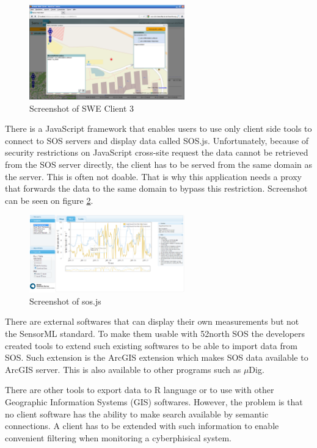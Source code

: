 \begin{figure}[h]
\centering
\includegraphics[width=0.6\textwidth]{figures/sweclient.png}
\caption{Screenshot of SWE Client 3\label{fig:sweclient}}
\end{figure}

There is a JavaScript framework that enables users to use only client side tools to connect to SOS servers and display data called SOS.js. Unfortunately, because of security restrictions on JavaScript cross-site request the data cannot be retrieved from the SOS server directly, the client has to be served from the same domain as the server. This is often not doable. That is why this application needs a proxy that forwards the data to the same domain to bypass this restriction. Screenshot can be seen on figure \ref{fig:sos-js}.

\begin{figure}[h]
\centering
\includegraphics[width=0.6\textwidth]{figures/sos-js.png}
\caption{Screenshot of sos.js\label{fig:sos-js}}
\end{figure}

There are external softwares that can display their own measurements but not the SensorML standard. To make them usable with 52north SOS the developers created tools to extend such existing softwares to be able to import data from SOS. Such extension is the ArcGIS extension which makes SOS data available to ArcGIS server. This is also available to other programs such as $\mu$Dig. 

There are other tools to export data to R language or to use with other Geographic Information Systems (GIS) softwares. However, the problem is that no client software has the ability to make search available by semantic connections. A client has to be extended with such information to enable convenient filtering when monitoring a cyberphisical system.


